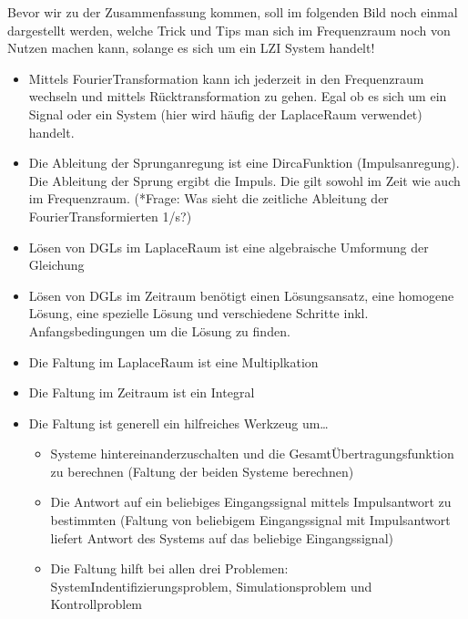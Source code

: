 \documentclass[letterpaper,10pt,english]{jupyterBook}
\begin{document}
\sphinxAtStartPar
Bevor wir zu der Zusammenfassung kommen, soll im folgenden Bild noch einmal dargestellt werden, welche Trick und Tips man sich im Frequenzraum noch von Nutzen machen kann, solange es sich um ein LZI System handelt!
\begin{itemize}
\item {} 
\sphinxAtStartPar
Mittels Fourier\sphinxhyphen{}Transformation kann ich jederzeit in den Frequenzraum wechseln und mittels Rücktransformation zu gehen. Egal ob es sich um ein Signal oder ein System (hier wird häufig der Laplace\sphinxhyphen{}Raum verwendet) handelt.

\item {} 
\sphinxAtStartPar
Die Ableitung der Sprunganregung ist eine Dirca\sphinxhyphen{}Funktion (Impulsanregung). Die Ableitung der Sprung ergibt die Impuls. Die gilt sowohl im Zeit\sphinxhyphen{} wie auch im Frequenzraum. (*Frage: Was sieht die zeitliche Ableitung der Fourier\sphinxhyphen{}Transformierten 1/s?)

\item {} 
\sphinxAtStartPar
Lösen von DGLs im Laplace\sphinxhyphen{}Raum ist eine algebraische Umformung der Gleichung

\item {} 
\sphinxAtStartPar
Lösen von DGLs im Zeitraum benötigt einen Lösungsansatz, eine homogene Lösung, eine spezielle Lösung und verschiedene Schritte inkl. Anfangsbedingungen um die Lösung zu finden.

\item {} 
\sphinxAtStartPar
Die Faltung im Laplace\sphinxhyphen{}Raum ist eine Multiplkation

\item {} 
\sphinxAtStartPar
Die Faltung im Zeitraum ist ein Integral

\item {} 
\sphinxAtStartPar
Die Faltung ist generell ein hilfreiches Werkzeug um…
\begin{itemize}
\item {} 
\sphinxAtStartPar
Systeme hintereinanderzuschalten und die Gesamt\sphinxhyphen{}Übertragungsfunktion zu berechnen (Faltung der beiden Systeme berechnen)

\item {} 
\sphinxAtStartPar
Die Antwort auf ein beliebiges Eingangssignal mittels Impulsantwort zu bestimmten (Faltung von beliebigem Eingangssignal mit Impulsantwort liefert Antwort des Systems auf das beliebige Eingangssignal)

\item {} 
\sphinxAtStartPar
Die Faltung hilft bei allen drei Problemen: System\sphinxhyphen{}Indentifizierungsproblem, Simulationsproblem und Kontrollproblem

\end{itemize}

\end{itemize}
\end{document}
